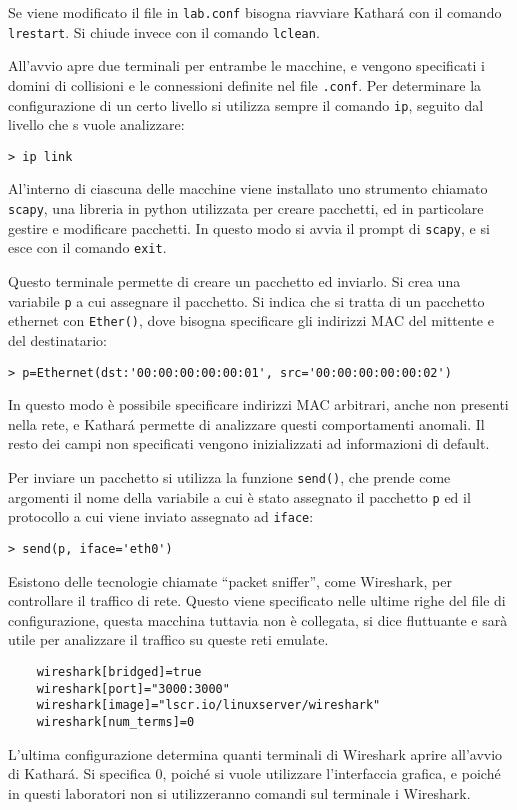 \documentclass{article}
\numberwithin{equation}{subsection}
\begin{document}
Se viene modificato il file in \verb|lab.conf| bisogna riavviare Kathará con il comando \verb|lrestart|. Si chiude invece con il comando \verb|lclean|. 

All'avvio apre due terminali per entrambe le macchine, e vengono specificati i domini di collisioni e le connessioni definite nel file \verb|.conf|. 
Per determinare la configurazione di un certo livello si utilizza sempre il comando \verb|ip|, seguito dal livello che s vuole analizzare:
\begin{verbatim}
> ip link
\end{verbatim}

Al'interno di ciascuna delle macchine viene installato uno strumento chiamato \verb|scapy|, una libreria in python utilizzata per creare pacchetti, ed in particolare 
gestire e modificare pacchetti. In questo modo si avvia il prompt di \verb|scapy|, e si esce con il comando \verb|exit|. 

Questo terminale permette di creare un pacchetto ed inviarlo. Si crea una variabile \verb|p| a cui assegnare il pacchetto. Si indica che si tratta di un 
pacchetto ethernet con \verb|Ether()|, dove bisogna specificare gli indirizzi MAC del mittente e del destinatario:
\begin{verbatim}
> p=Ethernet(dst:'00:00:00:00:00:01', src='00:00:00:00:00:02')
\end{verbatim} 
In questo modo è possibile specificare indirizzi MAC arbitrari, anche non presenti nella rete, e Kathar\'{a} permette di analizzare questi comportamenti anomali. 
Il resto dei campi non specificati vengono inizializzati ad informazioni di default. 

Per inviare un pacchetto si utilizza la funzione \verb|send()|, che prende come argomenti il nome della variabile a cui è stato assegnato il pacchetto \verb|p| ed 
il protocollo a cui viene inviato assegnato ad \verb|iface|:
\begin{verbatim}
> send(p, iface='eth0')
\end{verbatim}

Esistono delle tecnologie chiamate ``packet sniffer'', come Wireshark, per controllare il traffico di rete. Questo viene specificato nelle ultime righe del 
file di configurazione, questa macchina tuttavia non è collegata, si dice fluttuante e sarà utile per analizzare il traffico su queste reti emulate. 
\begin{verbatim}
	wireshark[bridged]=true
	wireshark[port]="3000:3000"
	wireshark[image]="lscr.io/linuxserver/wireshark"
	wireshark[num_terms]=0
\end{verbatim}
L'ultima configurazione determina quanti terminali di Wireshark aprire all'avvio di Kathar\'{a}. Si specifica 0, poiché si vuole utilizzare l'interfaccia grafica, e 
poiché in questi laboratori non si utilizzeranno comandi sul terminale i Wireshark. 
\end{document}
